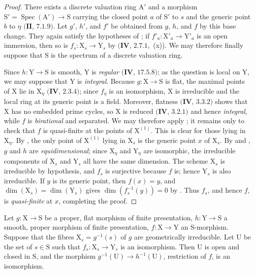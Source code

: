 \begin{proof}
There exists a discrete valuation ring $\mathrm{A}'$ and a morphism $\mathrm{S}'=\operatorname{Spec}(\mathrm{A}')\to\mathrm{S}$ carrying the closed point $a$ of $\mathrm{S}'$ to $s$ and the generic point $b$ to $\eta$ $(\mathbf{II}$, $7.1.9)$.  Let $g'$, $h'$, and $f'$ be obtained from $g$, $h$, and $f$ by this base change.  They again satisfy the hypotheses of ; if $f'_a:\mathrm{X}'_a\to\mathrm{Y}'_a$ is an open immersion, then so is $f_s:\mathrm{X}_s\to\mathrm{Y}_s$ by $(\mathbf{IV}$, $2.7.1$,~(x)).  We may therefore finally suppose that $\mathrm{S}$ is the spectrum of a discrete valuation ring.

Since $h:\mathrm{Y}\to\mathrm{S}$ is smooth, $\mathrm{Y}$ is \emph{regular} $(\mathbf{IV}$, $17.5.8)$; as the question is local on $\mathrm{Y}$, we may suppose that $\mathrm{Y}$ is \emph{integral}.
Because $g:\mathrm{X}\to\mathrm{S}$ is flat, the maximal points of $\mathrm{X}$ lie in $\mathrm{X}_\eta$ $(\mathbf{IV}$, $2.3.4)$; since $f_\eta$ is an isomorphism, $\mathrm{X}$ is irreducible and the local ring at its generic point is a field.  Moreover, flatness $(\mathbf{IV}$, $3.3.2)$ shows that $\mathrm{X}$ has no embedded prime cycles, so $\mathrm{X}$ is reduced $(\mathbf{IV}$, $3.2.1)$ and hence \emph{integral}, while $f$ is \emph{birational} and separated.
We may therefore apply ; it remains only to check that $f$ is quasi-finite at the points of $\mathrm{X}^{(1)}$.  This is clear for those lying in $\mathrm{X}_\eta$.  By , the only point of $\mathrm{X}^{(1)}$ lying in $\mathrm{X}_s$ is the generic point $x$ of $\mathrm{X}_s$.
By  and , $g$ and $h$ are \emph{equidimensional}; since $\mathrm{X}_\eta$ and $\mathrm{Y}_\eta$ are isomorphic, the irreducible components of $\mathrm{X}_s$ and $\mathrm{Y}_s$ all have the same dimension.  The scheme $\mathrm{X}_s$ is irreducible by hypothesis, and $f_s$ is surjective because $f$ is; hence $\mathrm{Y}_s$ is also irreducible.  If $y$ is its generic point, then $f(x)=y$, and $\dim(\mathrm{X}_s)=\dim(\mathrm{Y}_s)$ gives $\dim(f_s^{-1}(y))=0$ by .  Thus $f_s$, and hence $f$, is \emph{quasi-finite} at $x$, completing the proof.
\end{proof}

\begin{corollary}[21.12.16]
\label{IV.21.12.16}
Let $g:\mathrm{X}\to\mathrm{S}$ be a proper, flat morphism of finite presentation, $h:\mathrm{Y}\to\mathrm{S}$ a smooth, proper morphism of finite presentation, $f:\mathrm{X}\to\mathrm{Y}$ an S-morphism.
Suppose that the fibres $\mathrm{X}_s=g^{-1}(s)$ of $g$ are geometrically irreducible.
Let $\mathrm{U}$ be the set of $s\in\mathrm{S}$ such that $f_s:\mathrm{X}_s\to\mathrm{Y}_s$ is an isomorphism.
Then $\mathrm{U}$ is open and closed in $\mathrm{S}$, and the morphism $g^{-1}(\mathrm{U})\to h^{-1}(\mathrm{U})$, restriction of $f$, is an isomorphism.
\end{corollary}

